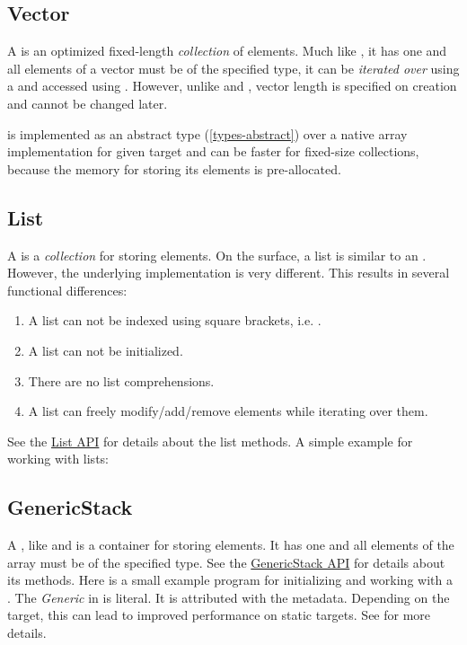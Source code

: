 \documentclass{haxe}
\begin{document}
\subsection{Vector}
\label{std-vector}

A  is an optimized fixed-length \emph{collection} of elements. Much like , it has one  and all elements of a vector must be of the specified type, it can be \emph{iterated over} using a  and accessed using . However, unlike  and , vector length is specified on creation and cannot be changed later.


 is implemented as an abstract type (\ref{types-abstract}) over a native array implementation for given target and can be faster for fixed-size collections, because the memory for storing its elements is pre-allocated.

\subsection{List}
\label{std-List}
A  is a \emph{collection} for storing elements.  On the surface, a list is similar to an .  However, the underlying implementation is very different.  This results in several functional differences:
\begin{enumerate}
	\item A list can not be indexed using square brackets, i.e. \expr{[0]}.
	\item A list can not be initialized.
	\item There are no list comprehensions.
	\item A list can freely modify/add/remove elements while iterating over them.
\end{enumerate}

See the \href{http://api.haxe.org/List.html}{List API} for details about the list methods.  A simple example for working with lists:

\subsection{GenericStack}
\label{std-GenericStack}
A , like  and  is a container for storing elements.  It has one  and all elements of the array must be of the specified type. See the \href{http://api.haxe.org/haxe/ds/GenericStack.html}{GenericStack API} for details about its methods.  Here is a small example program for initializing and working with a .
The \emph{Generic} in  is literal.  It is attributed with the  metadata.  Depending on the target, this can lead to improved performance on static targets.  See  for more details.
\end{document}
